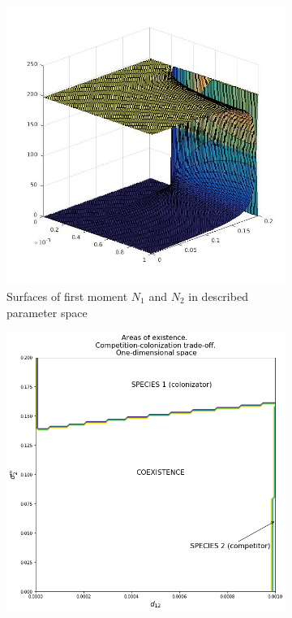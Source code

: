 \begin{figure}
	\centering
	\begin{subfigure}{.5\textwidth}
		\centering
		\includegraphics[width=.95\linewidth]{N1N2cctoD1.jpg}
		\caption{Surfaces of first moment \(N_1\) and \(N_2\) in described parameter space}
		\label{fig:cctod1:sub1}
	\end{subfigure}%
	\begin{subfigure}{.5\textwidth}
		\centering
		\includegraphics[width=.95\linewidth]{arccto08d1.png}

\end{subfigure}
\end{figure}
